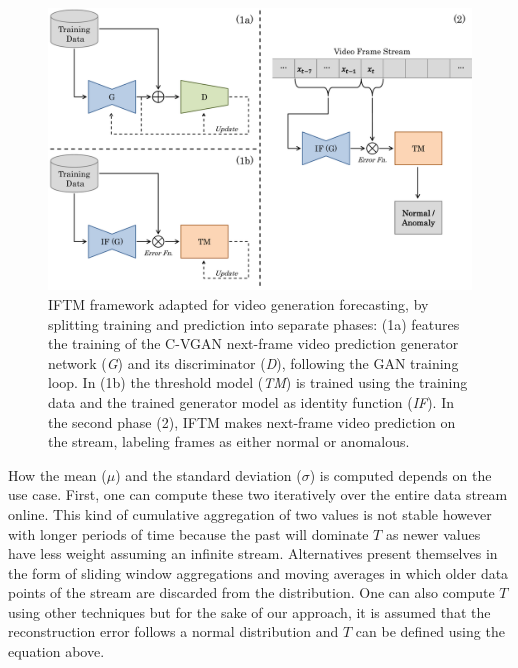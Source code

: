 \begin{figure}
	\centering
	\includegraphics[width=1\textwidth]{graphics/iftm/iftmModified/iftmModified.pdf}
  \caption[IFTM framework adapted for video generation forecasting.]{IFTM framework adapted for video generation forecasting, by splitting training and prediction into separate phases: (1a) features the training of the C-VGAN next-frame video prediction generator network (\textit{G}) and its discriminator (\textit{D}), following the GAN training loop. In (1b) the threshold model (\textit{TM}) is trained using the training data and the trained generator model as identity function (\textit{IF}). In the second phase (2), IFTM makes next-frame video prediction on the stream, labeling frames as either normal or anomalous.}
  \label{fig:iftm_video}
\end{figure}

How the mean ($\mu$) and the standard deviation ($\sigma$) is computed depends on the use case. First, one can compute these two iteratively over the entire data stream online. This kind of cumulative aggregation of two values is not stable however with longer periods of time because the past will dominate $T$ as newer values have less weight assuming an infinite stream. Alternatives present themselves in the form of sliding window aggregations and moving averages in which older data points of the stream are discarded from the distribution. One can also compute $T$ using other techniques but for the sake of our approach, it is assumed that the reconstruction error follows a normal distribution and $T$ can be defined using the equation above.

